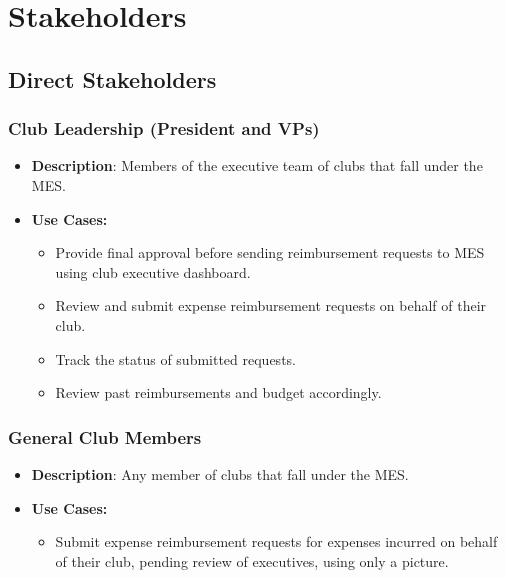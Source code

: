 \documentclass[12pt]{article}
\begin{document}
\section{Stakeholders}
  \subsection{Direct Stakeholders}
    \subsubsection{Club Leadership (President and VPs)}
      \begin{itemize}
        \item \textbf{Description}: Members of the executive team of clubs that fall under the MES.  
        \item \textbf{Use Cases:}
          \begin{itemize}
            \item Provide final approval before sending reimbursement requests to MES using club executive dashboard.
            \item Review and submit expense reimbursement requests on behalf of their club.
            \item Track the status of submitted requests.
            \item Review past reimbursements and budget accordingly.
          \end{itemize}
      \end{itemize}
    \subsubsection{General Club Members}
      \begin{itemize}
        \item \textbf{Description}: Any member of clubs that fall under the MES.
        \item \textbf{Use Cases:}
          \begin{itemize}
            \item Submit expense reimbursement requests for expenses incurred on behalf of their club, pending review of executives, using only a picture.
          \end{itemize}
      \end{itemize}
\end{document}
